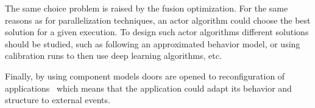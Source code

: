 The same choice problem is raised by the fusion optimization. For the same reasons as for parallelization techniques, an actor algorithm could choose the best solution for a given execution. To design such actor algorithms different solutions should be studied, such as following an approximated behavior model, or using calibration runs to then use deep learning algorithms, etc.

Finally, by using component models doors are opened to reconfiguration of applications~\cite{Lanore:2015:RCM:2737166.2737169} which means that the application could adapt its behavior and structure to external events.
